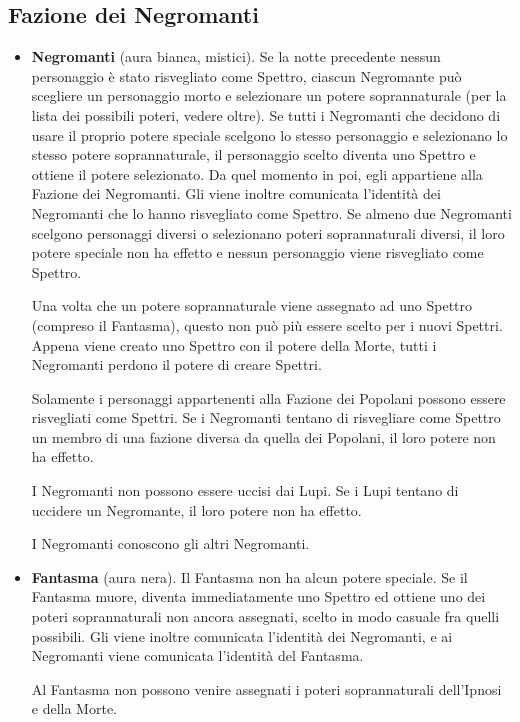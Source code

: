 \documentclass[a4paper,10pt]{article}
\begin{document}
\subsection*{Fazione dei Negromanti}
\label{negromanti}
\begin{itemize}

 \item {\bf Negromanti} (aura bianca, mistici). Se la notte precedente nessun personaggio è stato risvegliato come Spettro, ciascun Negromante può scegliere un personaggio morto e selezionare un potere soprannaturale (per la lista dei possibili poteri, vedere oltre). Se tutti i Negromanti che decidono di usare il proprio potere speciale scelgono lo stesso personaggio e selezionano lo stesso potere soprannaturale, il personaggio scelto diventa uno Spettro e ottiene il potere selezionato. Da quel momento in poi, egli appartiene alla Fazione dei Negromanti. Gli viene inoltre comunicata l'identità dei Negromanti che lo hanno risvegliato come Spettro.
 Se almeno due Negromanti scelgono personaggi diversi o selezionano poteri soprannaturali diversi, il loro potere speciale non ha effetto e nessun personaggio viene risvegliato come Spettro.
 
 Una volta che un potere soprannaturale viene assegnato ad uno Spettro (compreso il Fantasma), questo non può più essere scelto per i nuovi Spettri. Appena viene creato uno Spettro con il potere della Morte, tutti i Negromanti perdono il potere di creare Spettri.
 
 Solamente i personaggi appartenenti alla Fazione dei Popolani possono essere risvegliati come Spettri.
 Se i Negromanti tentano di risvegliare come Spettro un membro di una fazione diversa da quella dei Popolani, il loro potere non ha effetto.

 I Negromanti non possono essere uccisi dai Lupi. Se i Lupi tentano di uccidere un Negromante, il loro potere non ha effetto.

 I Negromanti conoscono gli altri Negromanti.
 
 \item {\bf Fantasma} (aura nera). Il Fantasma non ha alcun potere speciale. Se il Fantasma muore, diventa immediatamente uno Spettro ed ottiene uno dei poteri soprannaturali non ancora assegnati, scelto in modo casuale fra quelli possibili. Gli viene inoltre comunicata l'identità dei Negromanti, e ai Negromanti viene comunicata l'identità del Fantasma.
 
 Al Fantasma non possono venire assegnati i poteri soprannaturali dell'Ipnosi e della Morte.
 

\end{itemize}
\end{document}
